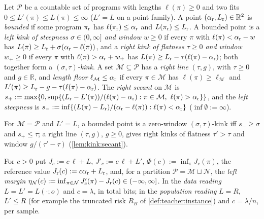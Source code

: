 \begin{definition}\label{def:kink:kinks}
Let $\mathcal P$ be a countable set of programs with lengths $\ell(\pi)\ge0$ and two fits $0\le L'(\pi)\le L(\pi)\le\infty$ ($L'=L$ on a point family). A point $(\alpha_{\rm r},L_{\rm r})\in\mathbb R^2$ is \emph{bounded} if some program $\pi_{\rm r}$ has $\ell(\pi_{\rm r})\le\alpha_{\rm r}$ and $L(\pi_{\rm r})\le L_{\rm r}$. A bounded point is a \emph{left kink of steepness $\sigma\in(0,\infty]$ and window $w\ge0$} if every $\pi$ with $\ell(\pi)<\alpha_{\rm r}-w$ has $L(\pi)\ge L_{\rm r}+\sigma(\alpha_{\rm r}-\ell(\pi))$, and a \emph{right kink of flatness $\tau\ge0$ and window $w_+\ge0$} if every $\pi$ with $\ell(\pi)>\alpha_{\rm r}+w_+$ has $L(\pi)\ge L_{\rm r}-\tau(\ell(\pi)-\alpha_{\rm r})$; both together form a \emph{$(\sigma,\tau)$-kink}. A set $\mathcal M\subseteq\mathcal P$ has a \emph{right line} $(\tau,g)$, with $\tau\ge0$ and $g\in\mathbb R$, and \emph{length floor} $\ell_{\mathcal M}\le\alpha_{\rm r}$ if every $\pi\in\mathcal M$ has $\ell(\pi)\ge\ell_{\mathcal M}$ and $L'(\pi)\ge L_{\rm r}-g-\tau(\ell(\pi)-\alpha_{\rm r})$. The \emph{right secant} on $\mathcal M$ is $s_+:=\max\{0,\sup\{(L_{\rm r}-L'(\pi))/(\ell(\pi)-\alpha_{\rm r}):\pi\in\mathcal M,\ \ell(\pi)>\alpha_{\rm r}\}\}$, and the \emph{left steepness} is $s_-:=\inf\{(L(\pi)-L_{\rm r})/(\alpha_{\rm r}-\ell(\pi)):\ell(\pi)<\alpha_{\rm r}\}$ ($\inf\emptyset:=\infty$).
\end{definition}

For $\mathcal M=\mathcal P$ and $L'=L$, a bounded point is a zero-window $(\sigma,\tau)$-kink iff $s_-\ge\sigma$ and $s_+\le\tau$; a right line $(\tau,g)$, $g\ge0$, gives right kinks of flatness $\tau'>\tau$ and window $g/(\tau'-\tau)$ (\cref{lem:kink:secant}).

For $c>0$ put $J_c:=c\,\ell+L$, $J'_c:=c\,\ell+L'$, $\Phi(c):=\inf_\pi J_c(\pi)$, the reference value $J_{\rm r}(c):=c\alpha_{\rm r}+L_{\rm r}$, and, for a partition $\mathcal P=\mathcal M\sqcup\mathcal N$, the \emph{left margin} $\eta_{\mathcal N}(c):=\inf_{\pi\in\mathcal N}J'_c(\pi)-J_{\rm r}(c)\in(-\infty,\infty]$. In the \emph{data reading} $L=L'=L(\cdot;o)$ and $c=\lambda$, in total bits; in the \emph{population reading} $L=R$, $L'\le R$ (for example the truncated risk $R_B$ of \cref{def:teacher:instance}) and $c=\lambda/n$, per sample.


